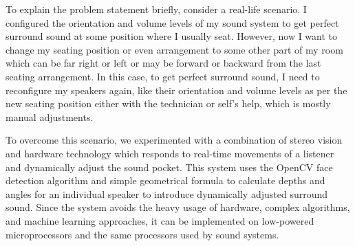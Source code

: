 \documentclass[../../../patent_v1.tex]{subfiles}
\begin{document}
To explain the problem statement briefly, consider a real-life scenario. I 
configured the orientation and volume levels of my sound system to get perfect 
surround sound at some position where I usually seat. However, now I want to 
change my seating position or even arrangement to some other part of my room 
which can be far right or left or may be forward or backward from the last seating 
arrangement. In this case, to get perfect surround sound, I need to reconfigure my 
speakers again, like their orientation and volume levels as per the new seating 
position either with the technician or self's help, which is mostly manual adjustments.

To overcome this scenario, we experimented with a combination of stereo vision and 
hardware technology which responds to real-time movements of a listener and dynamically 
adjust the sound pocket. This system uses the OpenCV face detection algorithm and 
simple geometrical formula to calculate depths and angles for an individual speaker 
to introduce dynamically adjusted surround sound. Since the system avoids the heavy 
usage of hardware, complex algorithms, and machine learning approaches, it can be 
implemented on low-powered microprocessors and the same processors used by sound systems.
\end{document}
